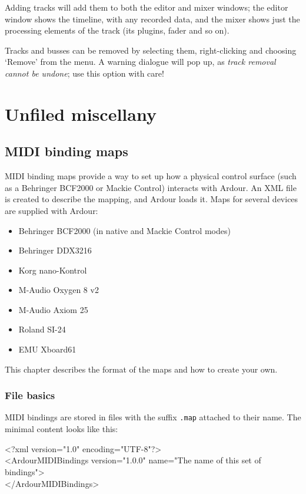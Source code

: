 \documentclass[10pt,a4paper]{book}
\begin{document}
Adding tracks will add them to both the editor and mixer windows; the
editor window shows the timeline, with any recorded data, and the
mixer shows just the processing elements of the track (its plugins,
fader and so on).

Tracks and busses can be removed by selecting them, right-clicking and
choosing `Remove' from the menu.  A warning dialogue will pop up, as
\emph{track removal cannot be undone}; use this option with care!

\chapter{Unfiled miscellany}

\section{MIDI binding maps}

MIDI binding maps provide a way to set up how a physical control
surface (such as a Behringer BCF2000 or Mackie Control) interacts with
Ardour.  An XML file is created to describe the mapping, and Ardour
loads it.  Maps for several devices are supplied with Ardour:

\begin{itemize}
\item Behringer BCF2000 (in native and Mackie Control modes)
\item Behringer DDX3216
\item Korg nano-Kontrol
\item M-Audio Oxygen 8 v2
\item M-Audio Axiom 25
\item Roland SI-24
\item EMU Xboard61
\end{itemize}

This chapter describes the format of the maps and how to create your own.


\subsection{File basics}

MIDI bindings are stored in files with the suffix \texttt{.map}
attached to their name. The minimal content looks like this:

\begin{listing}
<?xml version="1.0" encoding="UTF-8"?>\\
<ArdourMIDIBindings version="1.0.0" name="The name of this set of bindings">\\
</ArdourMIDIBindings>\\
\end{listing}
\end{document}
